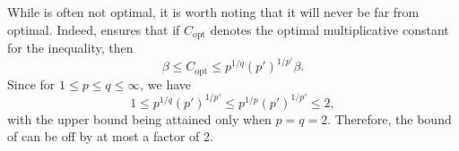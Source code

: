 \documentclass[oneside,10pt]{article}          %
\newtheorem{prop}{Proposition}
\numberwithin{equation}{section}
\begin{document}
While  is often not optimal, it is worth noting that it will never be far from optimal. Indeed,  ensures that if $C_{\mathrm{opt}}$ denotes the optimal multiplicative constant for the inequality, then
\[
\beta \leq C_{\mathrm{opt}} \leq p^{1/q}(p')^{1/p'}\beta .
\]
Since for $1\leq p\leq q \leq \infty$, we have
\[
1 \leq p^{1/q}(p')^{1/p'} \leq p^{1/p}(p')^{1/p'} \leq 2,
\]
with the upper bound being attained only when $p=q=2$. Therefore, the bound of  can be off by at most a factor of 2.

\end{document}
